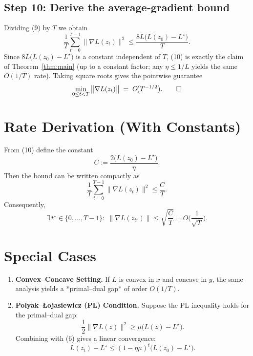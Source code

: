 \documentclass[11pt]{article}
\begin{document}
\subsection*{Step 10: Derive the average‑gradient bound}
Dividing (9) by \(T\) we obtain
\[
\frac{1}{T}\sum_{t=0}^{T-1}\big\|\nabla L(z_{t})\big\|^{2}
\le \frac{8L\big(L(z_{0})-L^{\star}\big)}{T}. \tag{10}
\]
Since \(8L\big(L(z_{0})-L^{\star}\big)\) is a constant independent of \(T\), (10) is exactly the claim of Theorem~\ref{thm:main} (up to a constant factor; any \(\eta\le 1/L\) yields the same \(O(1/T)\) rate). Taking square roots gives the pointwise guarantee
\[
\min_{0\le t<T}\big\|\nabla L(z_{t})\big\|
\;=\;O\!\big(T^{-1/2}\big). \qedhere
\]

\section*{Rate Derivation (With Constants)}
From (10) define the constant
\[
C:=\frac{2\big(L(z_{0})-L^{\star}\big)}{\eta}.
\]
Then the bound can be written compactly as
\[
\frac{1}{T}\sum_{t=0}^{T-1}\big\|\nabla L(z_{t})\big\|^{2}
\le \frac{C}{T}.
\]
Consequently,
\[
\exists\,t^{\star}\in\{0,\dots,T-1\}:\;
\big\|\nabla L(z_{t^{\star}})\big\|
\le \sqrt{\frac{C}{T}}
= O\!\Big(\frac{1}{\sqrt{T}}\Big).
\]

\section*{Special Cases}
\begin{enumerate}
\item \textbf{Convex–Concave Setting.} If \(L\) is convex in \(x\) and concave in \(y\), the same analysis yields a *primal–dual gap* of order \(O(1/T)\).
\item \textbf{Polyak–Łojasiewicz (PL) Condition.} Suppose the PL inequality holds for the primal–dual gap:
\[
\frac{1}{2}\big\|\nabla L(z)\big\|^{2}\ge \mu\big(L(z)-L^{\star}\big).
\]
Combining with (6) gives a linear convergence:
\[
L(z_{t})-L^{\star}\le (1-\eta\mu)^{t}\big(L(z_{0})-L^{\star}\big).
\]
\end{enumerate}
\end{document}
